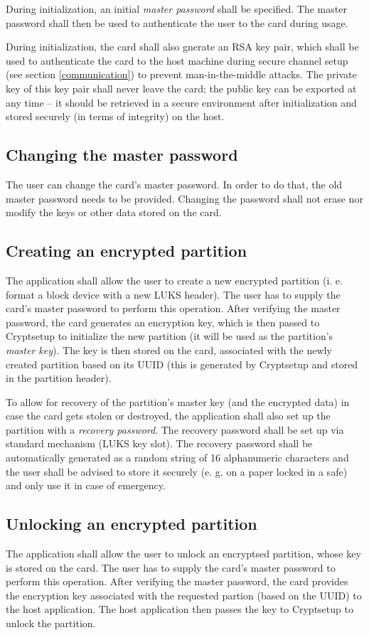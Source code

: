 \documentclass[10pt,a4paper]{article}
\begin{document}
During initialization, an initial \emph{master password} shall be specified. The master password shall then be used to authenticate the user to the card during usage.

During initialization, the card shall also gnerate an RSA key pair, which shall be used to authenticate the card to the host machine during secure channel setup (see section \ref{communication}) to prevent man-in-the-middle attacks. The private key of this key pair shall never leave the card; the public key can be exported at any time -- it should be retrieved in a secure environment after initialization and stored securely (in terms of integrity) on the host.

\subsection{Changing the master password}
The user can change the card's master password. In order to do that, the old master password needs to be provided. Changing the password shall not erase nor modify the keys or other data stored on the card.

\subsection{Creating an encrypted partition}
The application shall allow the user to create a new encrypted partition (i. e. format a block device with a new LUKS header). The user has to supply the card's master password to perform this operation. After verifying the master password, the card generates an encryption key, which is then passed to Cryptsetup to initialize the new partition (it will be used as the partition's \emph{master key}). The key is then stored on the card, associated with the newly created partition based on its UUID (this is generated by Cryptsetup and stored in the partition header).

To allow for recovery of the partition's master key (and the encrypted data) in case the card gets stolen or destroyed, the application shall also set up the partition with a \emph{recovery password}. The recovery password shall be set up via standard mechanism (LUKS key slot). The recovery password shall be automatically generated as a random string of 16 alphanumeric characters and the user shall be advised to store it securely (e. g. on a paper locked in a safe) and only use it in case of emergency.

\subsection{Unlocking an encrypted partition}
The application shall allow the user to unlock an encryptsed partition, whose key is stored on the card. The user has to supply the card's master password to perform this operation. After verifying the master password, the card provides the encryption key associated with the requested partion (based on the UUID) to the host application. The host application then passes the key to Cryptsetup to unlock the partition.
\end{document}
